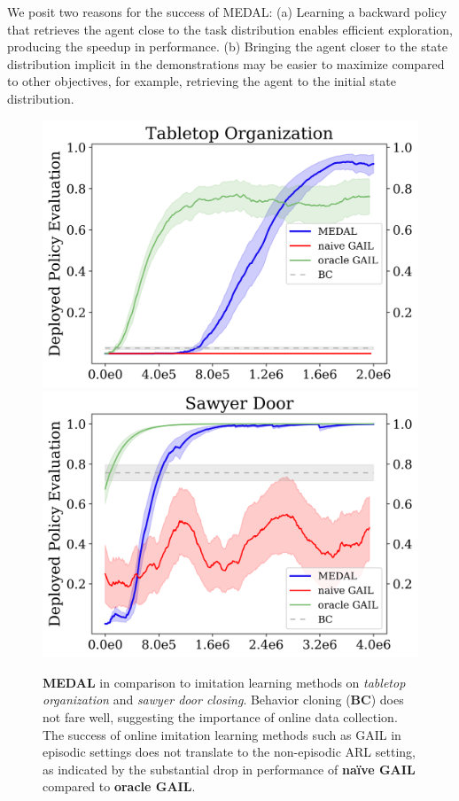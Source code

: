 \documentclass[nohyperref]{article}
\theoremstyle{plain}
\theoremstyle{definition}
\theoremstyle{remark}
\begin{document}
We posit two reasons for the success of MEDAL: (a) Learning a backward policy that retrieves the agent close to the task distribution enables efficient exploration, producing the speedup in performance. (b) Bringing the agent closer to the state distribution implicit in the demonstrations may be easier to maximize compared to other objectives, for example, retrieving the agent to the initial state distribution.




\begin{figure}[!h]
    \centering
    \includegraphics[width=0.8\columnwidth]{figures/oracle_naive_gail_tabletop_transfer.png}
    \includegraphics[width=0.8\columnwidth]{figures/oracle_naive_gail_door_transfer.png}
    \caption{\textbf{MEDAL} in comparison to imitation learning methods on \textit{tabletop organization} and \textit{sawyer door closing}. Behavior cloning (\textbf{BC}) does not fare well, suggesting the importance of online data collection. The success of online imitation learning methods such as GAIL in episodic settings does not translate to the non-episodic ARL setting, as indicated by the substantial drop in performance of \textbf{na\"ive GAIL} compared to \textbf{oracle GAIL}.}
    \label{fig:gail}
\end{figure}
\end{document}
